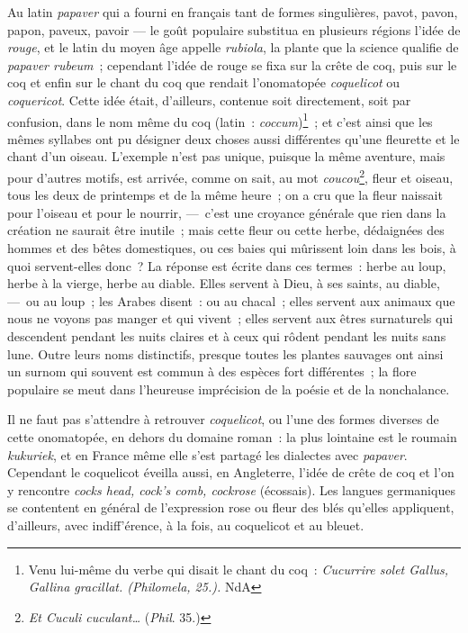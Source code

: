 \documentclass[french,twoside]{book} %
\def\mednobreak{\ifdim\lastskip<\medskipamount
  \removelastskip\nopagebreak\medskip\fi}
\newcommand{\labelblock}[1]{\medbreak{\noindent\color{rubric}\bfseries #1}\par\mednobreak}
\begin{document}
\labelblock{{\itshape Coquelicot.}}

\noindent Au latin {\itshape papaver} qui a fourni en français tant de formes singulières, pavot, pavon, papon, paveux, pavoir — le goût populaire substitua en plusieurs régions l’idée de {\itshape rouge}, et le latin du moyen âge appelle {\itshape rubiola}, la plante que la science qualifie de {\itshape papaver rubeum} ; cependant l’idée de rouge se fixa sur la crête de coq, puis sur le coq et enfin sur le chant du coq que rendait l’onomatopée {\itshape coquelicot} ou {\itshape coquericot}. Cette idée était, d’ailleurs, contenue soit directement, soit par confusion, dans le nom même du coq (latin : {\itshape coccum})\footnote{ Venu lui-même du verbe qui disait le chant du coq : \emph{Cucurrire solet Gallus, Gallina gracillat. {\citbibl ({\itshape Philomela}, 25.)}.} NdA} ; et c’est ainsi que les mêmes syllabes ont pu désigner deux choses aussi différentes qu’une fleurette et le chant d’un oiseau. L’exemple n’est pas unique, puisque la même aventure, mais pour d’autres motifs, est arrivée, comme on sait, au mot {\itshape coucou}\footnote{ \emph{Et Cuculi cuculant…} {\citbibl ({\itshape Phil}. 35.)} }, fleur et oiseau, tous les deux de printemps et de la même heure ; on a cru que la fleur naissait pour l’oiseau et pour le nourrir, — c’est une croyance générale que rien dans la création ne saurait être inutile ; mais cette fleur ou cette herbe, dédaignées des hommes et des bêtes domestiques, ou ces baies qui mûrissent loin dans les bois, à quoi servent-elles donc ? La réponse est écrite dans ces termes : herbe au loup, herbe à la vierge, herbe au diable. Elles servent à Dieu, à ses saints, au diable, — ou au loup ; les Arabes disent : ou au chacal ; elles servent aux animaux que nous ne voyons pas manger et qui vivent ; elles servent aux êtres surnaturels qui descendent pendant les nuits claires et à ceux qui rôdent pendant les nuits sans lune. Outre leurs noms distinctifs, presque toutes les plantes sauvages ont ainsi un surnom qui souvent est commun à des espèces fort différentes ; la flore populaire se meut dans l’heureuse imprécision de la poésie et de la nonchalance.\par
Il ne faut pas s’attendre à retrouver {\itshape coquelicot}, ou l’une des formes diverses de cette onomatopée, en dehors du domaine roman : la plus lointaine est le roumain {\itshape kukuriek}, et en France même elle s’est partagé les dialectes avec {\itshape papaver}. Cependant le coquelicot éveilla aussi, en Angleterre, l’idée de crête de coq et l’on y rencontre {\itshape cocks head, cock’s comb, cockrose} (écossais). Les langues germaniques se contentent en général de l’expression rose ou fleur des blés qu’elles appliquent, d’ailleurs, avec indiff’érence, à la fois, au coquelicot et au bleuet.\par
\end{document}
